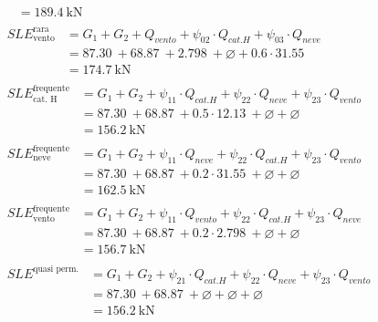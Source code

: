 \begin{align}
\begin{split}
	&= \SI{189.4}{\kilo\newton}
	\end{split} \\ 
	\begin{split}
	SLE^{\text{rara}}_{\text{vento}} &= G_1 + G_2 + Q_{vento} + \psi_{02}\cdot Q_{cat. H} + \psi_{03}\cdot Q_{neve}  \\
	&= \SI{87.30}{} + \SI{68.87}{} + \SI{2.798}{} + \varnothing + 0.6\cdot\SI{31.55}{}\\
	&= \SI{174.7}{\kilo\newton}
	\end{split} \\ 
	\begin{split}
	SLE^{\text{frequente}}_{\text{cat. H}} &= G_1 + G_2 + \psi_{11}\cdot Q_{cat. H} + \psi_{22}\cdot Q_{neve} + \psi_{23}\cdot Q_{vento}  \\
	&= \SI{87.30}{} + \SI{68.87}{} + 0.5\cdot\SI{12.13}{} + \varnothing +\varnothing\\
	&= \SI{156.2}{\kilo\newton}
	\end{split} \\ 
	\begin{split}
	SLE^{\text{frequente}}_{\text{neve}} &= G_1 + G_2 + \psi_{11}\cdot Q_{neve} + \psi_{22}\cdot Q_{cat. H} + \psi_{23}\cdot Q_{vento}  \\
	&= \SI{87.30}{} + \SI{68.87}{} + 0.2\cdot\SI{31.55}{} + \varnothing + \varnothing \\
	&= \SI{162.5}{\kilo\newton}
	\end{split} \\ 
	\begin{split}
	SLE^{\text{frequente}}_{\text{vento}} &= G_1 + G_2 + \psi_{11}\cdot Q_{vento} + \psi_{22}\cdot Q_{cat. H} + \psi_{23}\cdot Q_{neve}  \\
	&= \SI{87.30}{} + \SI{68.87}{} + 0.2\cdot\SI{2.798}{} + \varnothing + \varnothing\\
	&= \SI{156.7}{\kilo\newton}
	\end{split} \\ 
	\begin{split}
	SLE^{\text{quasi perm.}} &= G_1 + G_2 + \psi_{21}\cdot Q_{cat. H} + \psi_{22}\cdot Q_{neve} + \psi_{23}\cdot Q_{vento} \\
	&= \SI{87.30}{} + \SI{68.87}{} + \varnothing + \varnothing + \varnothing \\
	&= \SI{156.2}{\kilo\newton}
	\end{split} 
\end{align}

